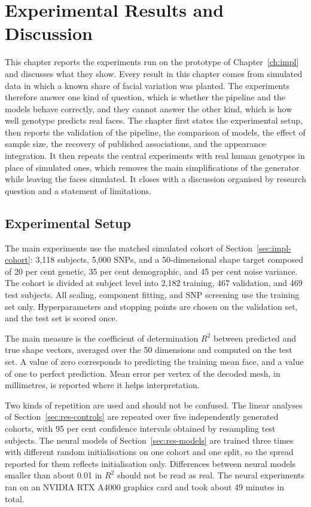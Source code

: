 \chapter{Experimental Results and Discussion}
\label{ch:results}
This chapter reports the experiments run on the prototype of Chapter~\ref{ch:impl} and discusses what they show. Every result in this chapter comes from simulated data in which a known share of facial variation was planted. The experiments therefore answer one kind of question, which is whether the pipeline and the models behave correctly, and they cannot answer the other kind, which is how well genotype predicts real faces. The chapter first states the experimental setup, then reports the validation of the pipeline, the comparison of models, the effect of sample size, the recovery of published associations, and the appearance integration. It then repeats the central experiments with real human genotypes in place of simulated ones, which removes the main simplifications of the generator while leaving the faces simulated. It closes with a discussion organised by research question and a statement of limitations.

\section{Experimental Setup}
The main experiments use the matched simulated cohort of Section~\ref{sec:impl-cohort}: 3{,}118 subjects, 5{,}000 SNPs, and a 50-dimensional shape target composed of 20 per cent genetic, 35 per cent demographic, and 45 per cent noise variance. The cohort is divided at subject level into 2{,}182 training, 467 validation, and 469 test subjects. All scaling, component fitting, and SNP screening use the training set only. Hyperparameters and stopping points are chosen on the validation set, and the test set is scored once.

The main measure is the coefficient of determination $R^2$ between predicted and true shape vectors, averaged over the 50 dimensions and computed on the test set. A value of zero corresponds to predicting the training mean face, and a value of one to perfect prediction. Mean error per vertex of the decoded mesh, in millimetres, is reported where it helps interpretation.

Two kinds of repetition are used and should not be confused. The linear analyses of Section~\ref{sec:res-controls} are repeated over five independently generated cohorts, with 95 per cent confidence intervals obtained by resampling test subjects. The neural models of Section~\ref{sec:res-models} are trained three times with different random initialisations on one cohort and one split, so the spread reported for them reflects initialisation only. Differences between neural models smaller than about 0.01 in $R^2$ should not be read as real. The neural experiments ran on an NVIDIA RTX A4000 graphics card and took about 49 minutes in total.

